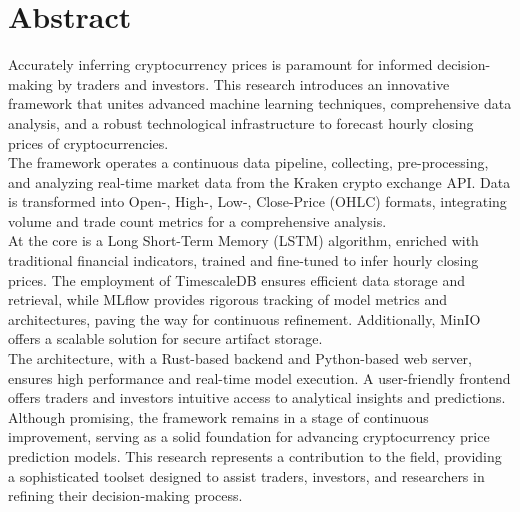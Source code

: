 \chapter{Abstract}

Accurately inferring cryptocurrency prices is paramount for informed decision-making by traders and investors. This research introduces an innovative framework that unites advanced machine learning techniques, comprehensive data analysis, and a robust technological infrastructure to forecast hourly closing prices of cryptocurrencies. \\

The framework operates a continuous data pipeline, collecting, pre-processing, and analyzing real-time market data from the Kraken crypto exchange API. Data is transformed into Open-, High-, Low-, Close-Price (OHLC) formats, integrating volume and trade count metrics for a comprehensive analysis. \\

At the core is a Long Short-Term Memory (LSTM) algorithm, enriched with traditional financial indicators, trained and fine-tuned to infer hourly closing prices. The employment of TimescaleDB ensures efficient data storage and retrieval, while MLflow provides rigorous tracking of model metrics and architectures, paving the way for continuous refinement. Additionally, MinIO offers a scalable solution for secure artifact storage. \\

The architecture, with a Rust-based backend and Python-based web server, ensures high performance and real-time model execution. A user-friendly frontend offers traders and investors intuitive access to analytical insights and predictions. \\

Although promising, the framework remains in a stage of continuous improvement, serving as a solid foundation for advancing cryptocurrency price prediction models. This research represents a contribution to the field, providing a sophisticated toolset designed to assist traders, investors, and researchers in refining their decision-making process. \\ 
